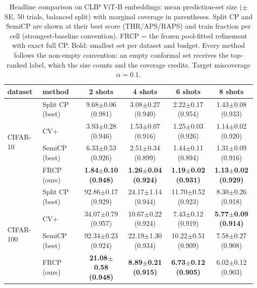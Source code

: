 \begin{table}[t]
\centering
\small
\caption{Headline comparison on CLIP ViT-B embeddings: mean prediction-set size ($\pm$ SE, 50 trials, balanced split) with marginal coverage in parentheses. Split CP and SemiCP are shown at their best score (THR/APS/RAPS) and train fraction per cell (strongest-baseline convention). FRCP = the frozen pool-fitted refinement with exact full CP. Bold: smallest set per dataset and budget. Every method follows the non-empty convention: an empty conformal set receives the top-ranked label, which the size counts and the coverage credits. Target miscoverage $\alpha=0.1$.}
\label{tab:headline-clipb}
\begin{tabular}{llcccc}
\toprule
dataset & method & 2 shots & 4 shots & 6 shots & 8 shots\\
\midrule
\multirow{4}{*}{CIFAR-10} & Split CP (best) & 9.68$\pm$0.06 {\scriptsize(0.981)} & 3.08$\pm$0.27 {\scriptsize(0.940)} & 2.22$\pm$0.17 {\scriptsize(0.954)} & 1.43$\pm$0.08 {\scriptsize(0.933)}\\
 & CV+ & 3.93$\pm$0.28 {\scriptsize(0.946)} & 1.53$\pm$0.07 {\scriptsize(0.916)} & 1.25$\pm$0.03 {\scriptsize(0.926)} & 1.14$\pm$0.02 {\scriptsize(0.920)}\\
 & SemiCP (best) & 6.33$\pm$0.53 {\scriptsize(0.926)} & 2.51$\pm$0.34 {\scriptsize(0.899)} & 1.44$\pm$0.11 {\scriptsize(0.894)} & 1.31$\pm$0.09 {\scriptsize(0.916)}\\
 & FRCP (ours) & \textbf{1.84$\pm$0.10 {\scriptsize(0.948)}} & \textbf{1.26$\pm$0.04 {\scriptsize(0.924)}} & \textbf{1.19$\pm$0.02 {\scriptsize(0.931)}} & \textbf{1.13$\pm$0.02 {\scriptsize(0.929)}}\\
\midrule
\multirow{4}{*}{CIFAR-100} & Split CP (best) & 92.86$\pm$0.17 {\scriptsize(0.929)} & 24.17$\pm$1.14 {\scriptsize(0.944)} & 11.70$\pm$0.52 {\scriptsize(0.923)} & 8.30$\pm$0.26 {\scriptsize(0.918)}\\
 & CV+ & 34.07$\pm$0.79 {\scriptsize(0.957)} & 10.67$\pm$0.22 {\scriptsize(0.924)} & 7.43$\pm$0.12 {\scriptsize(0.919)} & \textbf{5.77$\pm$0.09 {\scriptsize(0.914)}}\\
 & SemiCP (best) & 92.34$\pm$0.23 {\scriptsize(0.924)} & 22.19$\pm$1.30 {\scriptsize(0.934)} & 10.22$\pm$0.51 {\scriptsize(0.909)} & 7.58$\pm$0.27 {\scriptsize(0.908)}\\
 & FRCP (ours) & \textbf{21.08$\pm$0.58 {\scriptsize(0.948)}} & \textbf{8.89$\pm$0.21 {\scriptsize(0.915)}} & \textbf{6.73$\pm$0.12 {\scriptsize(0.905)}} & 6.02$\pm$0.12 {\scriptsize(0.903)}\\

\end{tabular}
\end{table}
